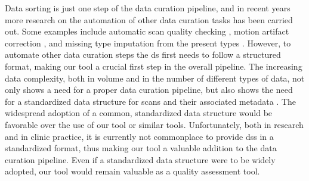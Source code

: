 Data sorting is just one step of the data curation pipeline, and in recent years more research on the automation of other data curation tasks has been carried out.
Some examples include automatic \gls{scan} quality checking \autocite{esteban2017mriqc}, motion artifact correction \autocite{tamada2020motion}, and missing \gls{type} imputation from the present \glspl{type} \autocite{lee2019collagan}.
However, to automate other data curation steps the \gls{ds} first needs to follow a structured format, making our tool a crucial first step in the overall pipeline.
The increasing data complexity, both in volume and in the number of different types of data, not only shows a need for a proper data curation pipeline, but also shows the need for a standardized data structure for \glspl{scan} and their associated metadata \autocite{erp2011infrastructure, gorgolewski2016brain, lambin2017radiomics}.
The widespread adoption of a common, standardized data structure would be favorable over the use of our tool or similar tools.
Unfortunately, both in research and in clinic practice, it is currently not commonplace to provide \glspl{ds} in a standardized format, thus making our tool a valuable addition to the data curation pipeline.
Even if a standardized data structure were to be widely adopted, our tool would remain valuable as a quality assessment tool.

